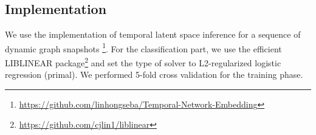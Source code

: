 \subsection{Implementation}

We use the implementation of temporal latent space inference for a sequence of dynamic graph snapshots \footnote{\url{https://github.com/linhongseba/Temporal-Network-Embedding}}\cite{Zhu2016}.
 For the classification part, we use the efficient LIBLINEAR \cite{fan2008liblinear} package\footnote{\url{https://github.com/cjlin1/liblinear}} and set the type of solver to L2-regularized logistic regression (primal). %
We performed 5-fold cross validation for the training phase.












